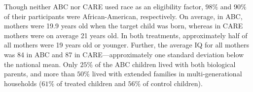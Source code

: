 

\noindent Though neither ABC nor CARE used race as an eligibility factor, $98\%$ and $90\%$ of their participants were African-American, respectively. On average, in ABC, mothers were 19.9 years old when the target child was born, whereas in CARE mothers were on average 21 years old. In both treatments, approximately half of all mothers were 19 years old or younger. Further, the average IQ for all mothers was 84 in ABC and 87 in CARE---approximately one standard deviation below the national mean. Only $25\%$ of the ABC children lived with both biological parents, and more than $50\%$ lived with extended families in multi-generational households ($61\%$ of treated children and $56\%$ of control children).\\

